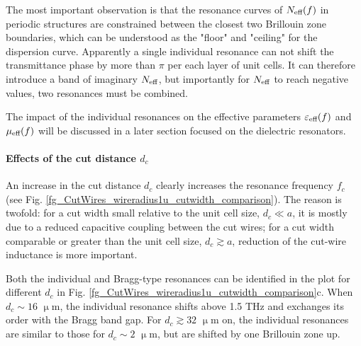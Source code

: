 The most important observation is that the resonance curves of $N_{\text{eff} }(f)$ in periodic structures are constrained between the closest two Brillouin zone boundaries, which can be understood as the "floor" and "ceiling" for the dispersion curve. Apparently a single individual resonance can not shift the transmittance phase by more than $\pi$ per each layer of unit cells. It can therefore introduce a band of imaginary $N_{\text{eff} }$, but importantly for $N_{\text{eff} }$ to reach negative values, two resonances must be combined.

The impact of the individual resonances on the effective parameters $\varepsilon_{\text{eff} }(f)$ and $\mu_{\text{eff} }(f)$ will be discussed in a later section focused on the dielectric resonators. %

\paragraph{Effects of the cut distance $d_c$}%
An increase in the cut distance $d_c$ clearly increases the resonance frequency $f_c$ (see Fig. \ref{fg_CutWires_wireradius1u_cutwidth_comparison}). The reason is twofold: for a cut width small relative to the unit cell size, $d_c\ll a$, it is mostly due to a reduced capacitive coupling between the cut wires; for a cut width comparable or greater than the unit cell size, $d_c \gtrsim a$, reduction of the cut-wire inductance is more important.

Both the individual and Bragg-type resonances can be identified in the plot for different $d_c$ in Fig. \ref{fg_CutWires_wireradius1u_cutwidth_comparison}c. When $d_c \sim 16$  $\upmu$m, the individual resonance shifts above 1.5 THz and exchanges its order with the Bragg band gap. 
For $d_c \gtrsim 32$  $\upmu$m on, the individual resonances are similar to those for $d_c\sim 2$ $\upmu$m, but are shifted by one Brillouin zone up.


